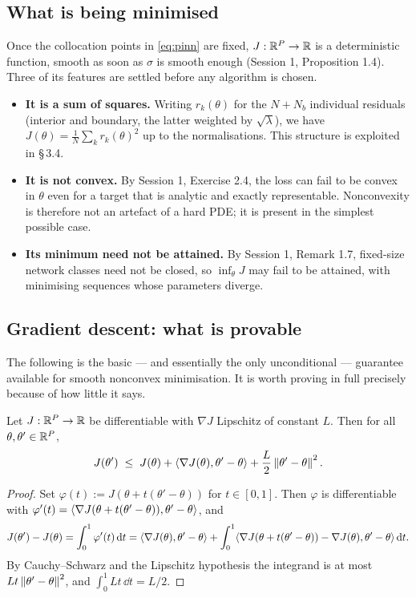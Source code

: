 \documentclass[11pt,a4paper]{article}
\begin{document}
\subsection{What is being minimised}

Once the collocation points in \eqref{eq:pinn} are fixed, $J : \mathbb{R}^P \to \mathbb{R}$ is a deterministic
function, smooth as soon as $\sigma$ is smooth enough (Session 1, Proposition 1.4). Three of its
features are settled before any algorithm is chosen.

\begin{itemize}
\item \textbf{It is a sum of squares.} Writing $r_k(\theta)$ for the $N + N_b$ individual residuals
(interior and boundary, the latter weighted by $\sqrt\lambda$), we have
$J(\theta) = \frac1N\sum_k r_k(\theta)^2$ up to the normalisations. This structure is exploited in
§\,3.4.
\item \textbf{It is not convex.} By Session 1, Exercise 2.4, the loss can fail to be convex in
$\theta$ even for a target that is analytic and exactly representable. Nonconvexity is therefore
not an artefact of a hard PDE; it is present in the simplest possible case.
\item \textbf{Its minimum need not be attained.} By Session 1, Remark 1.7, fixed-size network classes
need not be closed, so $\inf_\theta J$ may fail to be attained, with minimising sequences whose
parameters diverge.
\end{itemize}

\subsection{Gradient descent: what is provable}

The following is the basic --- and essentially the only unconditional --- guarantee available for
smooth nonconvex minimisation. It is worth proving in full precisely because of how little it says.

\begin{lemma}\label{lem:descent}
Let $J : \mathbb{R}^P \to \mathbb{R}$ be differentiable with $\nabla J$ Lipschitz of constant $L$. Then for all
$\theta, \theta' \in \mathbb{R}^P$,
\[
J(\theta') \;\le\; J(\theta) + \langle \nabla J(\theta) , \theta' - \theta \rangle + \frac{L}{2}\left\lVert \theta' - \theta \right\rVert^2 .
\]
\end{lemma}

\begin{proof}
Set $\varphi(t) := J(\theta + t(\theta'-\theta))$ for $t \in [0,1]$. Then $\varphi$ is
differentiable with $\varphi'(t) = \langle \nabla J(\theta + t(\theta'-\theta)) , \theta'-\theta \rangle$, and
\[
J(\theta') - J(\theta) = \int_0^1 \varphi'(t)\,\mathrm{d} t
= \langle \nabla J(\theta) , \theta'-\theta \rangle
+ \int_0^1 \langle \nabla J(\theta + t(\theta'-\theta)) - \nabla J(\theta) , \theta'-\theta \rangle\,\mathrm{d} t .
\]
By Cauchy--Schwarz and the Lipschitz hypothesis the integrand is at most
$Lt\left\lVert \theta'-\theta \right\rVert^2$, and $\int_0^1 Lt \,\dd t = L/2$.
\end{proof}
\end{document}
